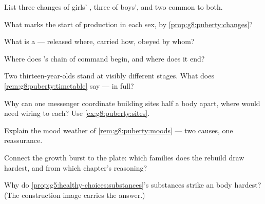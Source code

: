 \begin{exercise}[$\star$]\label{exo:g8:puberty:2}
List three changes of girls' , three of boys',
and two common to both.
\end{exercise}

\begin{exercise}[$\star$]\label{exo:g8:puberty:3}
What marks the start of  production in each sex,
by \cref{prop:g8:puberty:changes}?
\end{exercise}

\begin{exercise}[$\star$]\label{exo:g8:puberty:4}
What is a  --- released where, carried how,
obeyed by whom?
\end{exercise}

\begin{exercise}[$\star$]\label{exo:g8:puberty:5}
Where does 's chain of command begin, and where
does it end?
\end{exercise}

\begin{exercise}[$\star$]\label{exo:g8:puberty:6}
Two thirteen-year-olds stand at visibly different
stages. What does \cref{rem:g8:puberty:timetable} say
--- in full?
\end{exercise}

\begin{exercise}[$\star\star$]\label{exo:g8:puberty:7}
Why can one messenger coordinate building sites half a
body apart, where  would need wiring to each? Use
\cref{ex:g8:puberty:sites}.
\end{exercise}

\begin{exercise}[$\star\star$]\label{exo:g8:puberty:8}
Explain the mood weather of \cref{rem:g8:puberty:moods}
--- two causes, one reassurance.
\end{exercise}

\begin{exercise}[$\star\star$]\label{exo:g8:puberty:9}
Connect the growth burst to the plate: which 
families does the rebuild draw hardest, and from which
chapter's reasoning?
\end{exercise}

\begin{exercise}[$\star\star$]\label{exo:g8:puberty:10}
Why do \cref{prop:g5:healthy-choices:substances}'s
substances strike an  body hardest? (The
construction image carries the answer.)
\end{exercise}

